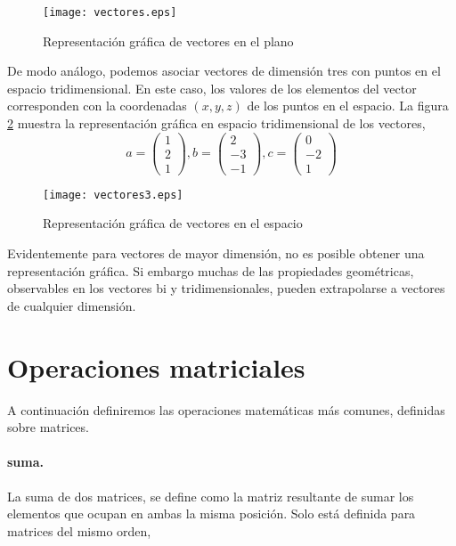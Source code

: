 \begin{figure}[h]
\centering
\texttt{[image: vectores.eps]}
\caption{Representación gráfica de vectores en el plano}
\label{fig:vectores}
\end{figure}

De modo análogo, podemos asociar vectores de dimensión tres con puntos en el espacio tridimensional. En este caso, los valores de los elementos del vector corresponden con la coordenadas $(x,y,z)$ de los puntos en el espacio. La figura \ref{fig:vectores3} muestra la representación gráfica en espacio tridimensional de los vectores, 
\begin{equation*}
a=
\begin{pmatrix}
1\\
2\\
1
\end{pmatrix},
b=
\begin{pmatrix}
2\\
-3\\
-1
\end{pmatrix},
c=
\begin{pmatrix}
0\\
-2\\
1
\end{pmatrix}
\end{equation*}

\begin{figure}[h]
\centering
\texttt{[image: vectores3.eps]}
\caption{Representación gráfica de vectores en el espacio}
\label{fig:vectores3}
\end{figure}

Evidentemente para vectores de mayor dimensión, no es posible obtener una representación gráfica. Si embargo muchas de las propiedades geométricas, observables en los vectores bi y tridimensionales, pueden extrapolarse a vectores de cualquier dimensión.



\section{Operaciones matriciales}\label{opmatr}

A continuación definiremos las operaciones matemáticas más comunes, definidas sobre matrices. 

\paragraph{suma.} La suma de dos matrices, se define como la matriz resultante de sumar los elementos que ocupan en ambas la misma posición. Solo está definida para matrices del mismo orden,

